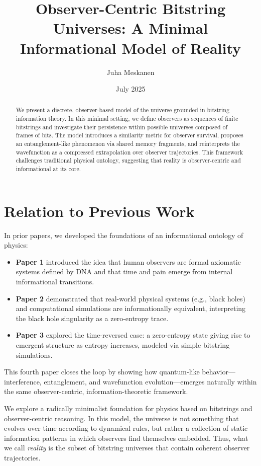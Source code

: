 \documentclass[12pt]{article}
\title{Observer-Centric Bitstring Universes: A Minimal Informational Model of Reality}
\author{Juha Meskanen}
\date{July 2025}
\begin{document}
\maketitle

\begin{abstract}
    We present a discrete, observer-based model of the universe grounded in bitstring information theory. In this minimal setting, we define observers as sequences of finite bitstrings and investigate their persistence within possible universes composed of frames of bits. The model introduces a similarity metric for observer survival, proposes an entanglement-like phenomenon via shared memory fragments, and reinterprets the wavefunction as a compressed extrapolation over observer trajectories. This framework challenges traditional physical ontology, suggesting that reality is observer-centric and informational at its core.
\end{abstract}


\section*{Relation to Previous Work}

In prior papers, we developed the foundations of an informational ontology of physics:

\begin{itemize}
    \item \textbf{Paper 1} introduced the idea that human observers are formal axiomatic systems defined by DNA and that time and pain emerge from internal informational transitions.
    \item \textbf{Paper 2} demonstrated that real-world physical systems (e.g., black holes) and computational simulations are informationally equivalent, interpreting the black hole singularity as a zero-entropy trace.
    \item \textbf{Paper 3} explored the time-reversed case: a zero-entropy state giving rise to emergent structure as entropy increases, modeled via simple bitstring simulations.
\end{itemize}

This fourth paper closes the loop by showing how quantum-like behavior—interference, entanglement, and wavefunction evolution—emerges naturally within the same observer-centric, information-theoretic framework.

We explore a radically minimalist foundation for physics based on bitstrings and observer-centric reasoning. In this model, the universe is not something that evolves over time according to dynamical rules, but rather a collection of static information patterns in which observers find themselves embedded. Thus, what we call \emph{reality} is the subset of bitstring universes that contain coherent observer trajectories.
\end{document}
